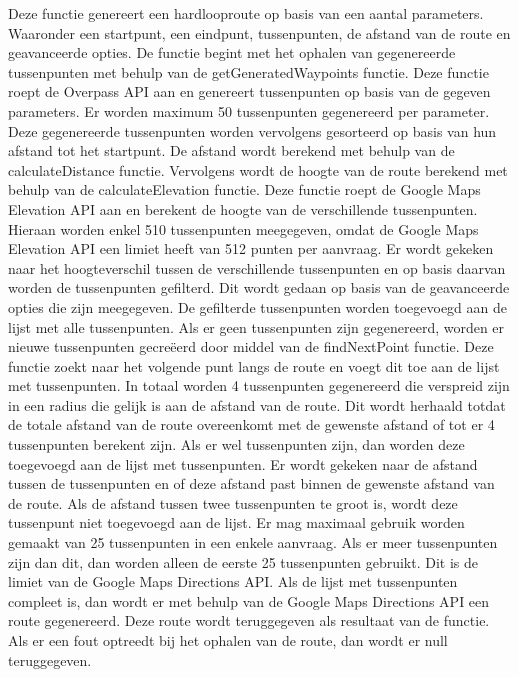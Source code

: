 Deze functie genereert een hardlooproute op basis van een aantal parameters. Waaronder een startpunt, een eindpunt, tussenpunten, de afstand van de route en geavanceerde opties.
De functie begint met het ophalen van gegenereerde tussenpunten met behulp van de getGeneratedWaypoints functie. Deze functie roept de Overpass API aan en genereert tussenpunten op basis van de gegeven parameters.
Er worden maximum 50 tussenpunten gegenereerd per parameter.
Deze gegenereerde tussenpunten worden vervolgens gesorteerd op basis van hun afstand tot het startpunt. De afstand wordt berekend met behulp van de calculateDistance functie.
Vervolgens wordt de hoogte van de route berekend met behulp van de calculateElevation functie. Deze functie roept de Google Maps Elevation API aan en berekent de hoogte van de verschillende tussenpunten. 
Hieraan worden enkel 510 tussenpunten meegegeven, omdat de Google Maps Elevation API een limiet heeft van 512 punten per aanvraag.
Er wordt gekeken naar het hoogteverschil tussen de verschillende tussenpunten en op basis daarvan worden de tussenpunten gefilterd. Dit wordt gedaan op basis van de geavanceerde opties die zijn meegegeven.
De gefilterde tussenpunten worden toegevoegd aan de lijst met alle tussenpunten. Als er geen tussenpunten zijn gegenereerd, worden er nieuwe tussenpunten gecreëerd door middel van de findNextPoint functie. 
Deze functie zoekt naar het volgende punt langs de route en voegt dit toe aan de lijst met tussenpunten. In totaal worden 4 tussenpunten gegenereerd die verspreid zijn in een radius die gelijk is aan de afstand van de route.
Dit wordt herhaald totdat de totale afstand van de route overeenkomt met de gewenste afstand of tot er 4 tussenpunten berekent zijn.
Als er wel tussenpunten zijn, dan worden deze toegevoegd aan de lijst met tussenpunten. Er wordt gekeken naar de afstand tussen de tussenpunten en of deze afstand past binnen de gewenste afstand van de route. 
Als de afstand tussen twee tussenpunten te groot is, wordt deze tussenpunt niet toegevoegd aan de lijst.
Er mag maximaal gebruik worden gemaakt van 25 tussenpunten in een enkele aanvraag. Als er meer tussenpunten zijn dan dit, dan worden alleen de eerste 25 tussenpunten gebruikt.
Dit is de limiet van de Google Maps Directions API.
Als de lijst met tussenpunten compleet is, dan wordt er met behulp van de Google Maps Directions API een route gegenereerd. 
Deze route wordt teruggegeven als resultaat van de functie. Als er een fout optreedt bij het ophalen van de route, dan wordt er null teruggegeven.
